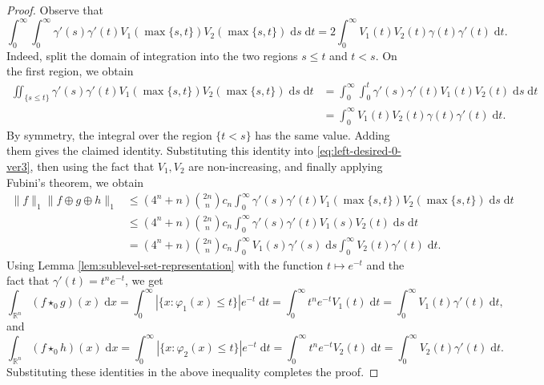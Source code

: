\documentclass[11pt]{amsart}
\theoremstyle{plain}
\theoremstyle{definition}
\theoremstyle{remark}
\begin{document}
\begin{proof}
        Observe that
        \[
            \int_{0}^{\infty}\int_{0}^{\infty}\gamma'(s) \gamma'(t) V_1(\max\{s,t\}) V_2(\max\{s,t\})  \;\mathrm d s \;\mathrm d t = 2\int_{0}^{\infty} V_1 (t) V_2 (t) \gamma(t) \gamma '(t) \;\mathrm d t.
        \]
        Indeed, split the domain of integration into the two regions $s \leq t$ and $t < s$. On the first region, we obtain
        \begin{align}
            \iint_{\{s\leq t\}} \gamma'(s) \gamma'(t) V_1(\max\{s,t\}) V_2(\max\{s,t\})  \;\mathrm d s \;\mathrm d t
            &= \int_0^\infty \int_{0}^t \gamma'(s) \gamma'(t) V_1(t) V_2(t)  \;\mathrm d s \;\mathrm d t
            \\
            &= \int_{0}^{\infty} V_1 (t) V_2 (t) \gamma(t) \gamma '(t) \;\mathrm d t.
        \end{align}
        By symmetry, the integral over the region $\{t<s\}$ has the same value. Adding them gives the claimed identity. Substituting this identity into \eqref{eq:left-desired-0-ver3}, then using the fact that $V_1,V_2$ are non-increasing, and finally applying Fubini's theorem, we obtain
        \begin{align}
            \|f\|_1 \|f \oplus g \oplus h\|_1
            &\leq  (4^n+n)\binom{2n}{n}c_n \int_{0}^{\infty}\gamma'(s) \gamma'(t) V_1(\max\{s,t\}) V_2(\max\{s,t\})  \;\mathrm d s \;\mathrm d t
            \\
            &\leq (4^n+n)\binom{2n}{n}c_n \int_{0}^{\infty} \gamma'(s) \gamma'(t) V_1(s) V_2(t)  \;\mathrm d s \;\mathrm d t
            \\
            &=
            (4^n+n)\binom{2n}{n}c_n  \int_0^{\infty}V_1 (s) \gamma '(s)\;\mathrm d s\int_0^{\infty}V_2 (t) \gamma '(t)\;\mathrm d t.
        \end{align}
        Using Lemma \ref{lem:sublevel-set-representation} with the function $ t \mapsto e^{-t}$ and the fact that $\gamma '(t)=t^ne^{-t}$, we get
        \begin{equation}
        \int_{\mathbb{R}^n} (f \star_0 g)(x) \;\mathrm d x=\int_0^{\infty}|\{x: \varphi_1(x) \leq t\}|e^{-t} \;\mathrm d t =\int_0^{\infty}t^ne^{-t}V_1 (t) \;\mathrm d t =\int_0^{\infty}V_1 (t) \gamma '(t)\;\mathrm d t, \label{eq:left-desired-1}
        \end{equation}
        and
        \begin{equation}
            \int_{\mathbb{R}^n} (f \star_0 h)(x) \;\mathrm d x=\int_0^{\infty}|\{x: \varphi_2(x) \leq t\}|e^{-t} \;\mathrm d t =\int_0^{\infty}t^ne^{-t}V_2 (t) \;\mathrm d t=\int_0^{\infty}V_2 (t) \gamma '(t)\;\mathrm d t. \label{eq:left-desired-2}
        \end{equation}
        Substituting these identities in the above inequality completes the proof.
\end{proof}
\end{document}
